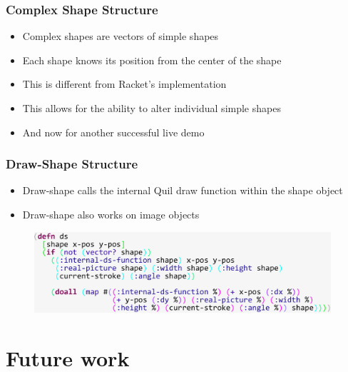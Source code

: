 \documentclass{beamer}
\begin{document}
\begin{frame}
\frametitle{Complex Shape Structure}
	\begin{itemize}
		\item Complex shapes are vectors of simple shapes
		\item Each shape knows its position from the center of the shape
		\item This is different from Racket's implementation
		\item This allows for the ability to alter individual simple shapes
	\end{itemize}
\end{frame}

\begin{frame}
	\begin{itemize}
		\item And now for another successful live demo
	\end{itemize}
\end{frame}

\begin{frame}
\frametitle{Draw-Shape Structure}
	\begin{itemize}
		\item Draw-shape calls the internal Quil draw function within the shape object
		\item Draw-shape also works on image objects
	\end{itemize}
	\begin{figure}
		\includegraphics[width=11cm]{PresentationImages/dsCode.pdf}
	\end{figure}
\end{frame}

\section{Future work}
\end{document}
